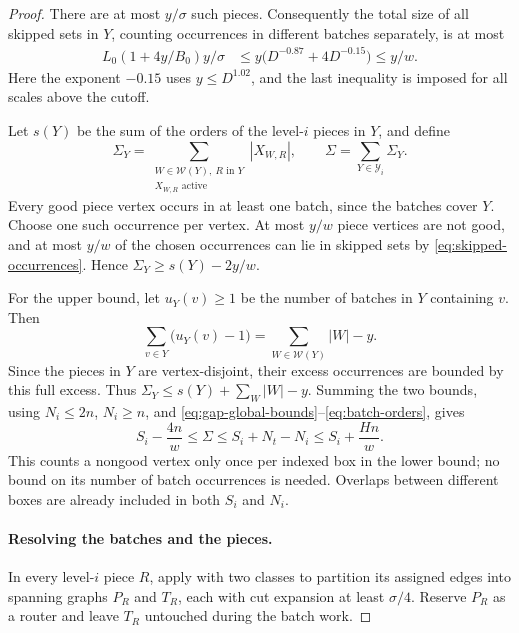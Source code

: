 \begin{proof}
There are at most \(y/\sigma\) such pieces. Consequently the
total size of all skipped sets in \(Y\), counting occurrences
in different batches separately, is at most
\begin{align}
 L_0(1+4y/B_0)y/\sigma
 &\le y\bigl(D^{-0.87}+4D^{-0.15}\bigr)
 \le y/w.\label{eq:skipped-occurrences}
\end{align}
Here the exponent \(-0.15\) uses \(y\le D^{1.02}\), and the
last inequality is imposed for all scales above the cutoff.

Let \(s(Y)\) be the sum of the orders of the level-\(i\)
pieces in \(Y\), and define
\[
 \Sigma_Y=\sum_{\substack{W\in\mathcal W(Y),\ R\text{ in }Y\\
                         X_{W,R}\text{ active}}}|X_{W,R}|,
 \qquad \Sigma=\sum_{Y\in\mathcal Y_i}\Sigma_Y.
\]
Every good piece vertex occurs in at least one batch, since the
batches cover \(Y\). Choose one such occurrence per vertex.
At most \(y/w\) piece vertices are not good, and at most
\(y/w\) of the chosen occurrences can lie in skipped sets by
\eqref{eq:skipped-occurrences}. Hence
\(\Sigma_Y\ge s(Y)-2y/w\).

For the upper bound, let \(u_Y(v)\ge1\) be the number of
batches in \(Y\) containing \(v\). Then
\[
 \sum_{v\in Y}\bigl(u_Y(v)-1\bigr)
 =\sum_{W\in\mathcal W(Y)}|W|-y.
\]
Since the pieces in \(Y\) are vertex-disjoint, their excess
occurrences are bounded by this full excess. Thus
\(\Sigma_Y\le s(Y)+\sum_W|W|-y\). Summing the two bounds,
using \(N_i\le2n\), \(N_i\ge n\), and
\eqref{eq:gap-global-bounds}--\eqref{eq:batch-orders}, gives
\begin{equation}\label{eq:active-order}
 S_i-\frac{4n}{w}\le\Sigma
 \le S_i+N_t-N_i\le S_i+\frac{Hn}{w}.
\end{equation}
This counts a nongood vertex only once per indexed box in the
lower bound; no bound on its number of batch occurrences is
needed. Overlaps between different boxes are already included
in both \(S_i\) and \(N_i\).

\paragraph{Resolving the batches and the pieces.}
In every level-\(i\) piece \(R\), apply
 with two classes to partition its assigned
edges into spanning graphs \(P_R\) and \(T_R\), each with
cut expansion at least \(\sigma/4\). Reserve \(P_R\) as a
router and leave \(T_R\) untouched during the batch work.


\end{proof}
